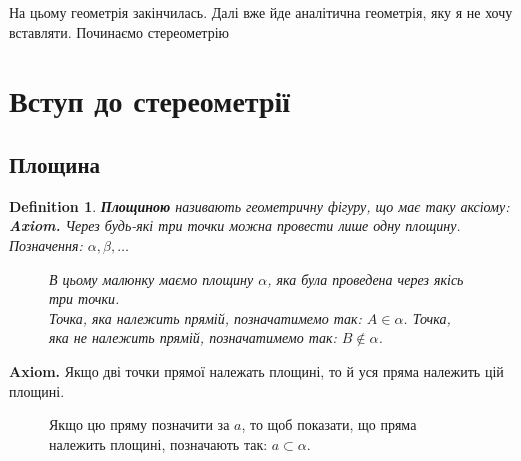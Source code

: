 \documentclass[a4paper, 10pt]{article}
\theoremstyle{theoremdd}
\theoremstyle{theoremdd}
\theoremstyle{theoremdd}
\newtheorem{definition}[theorem]{Definition}
\theoremstyle{theoremdd}
\theoremstyle{theoremdd}
\theoremstyle{theoremdd}
\theoremstyle{theoremdd}
\theoremstyle{theoremdd}
\theoremstyle{theoremdd}
\begin{document}
\newpage

\iffalse
\newpage
На цьому геометрія закінчилась. Далі вже йде аналітична геометрія, яку я не хочу вставляти. Починаємо стереометрію
\newpage

\section{Вступ до стереометрії}
\subsection{Площина}
\begin{definition}
\textbf{Площиною} називають геометричну фігуру, що має таку аксіому:\\
\textbf{Axiom.} Через будь-які три точки можна провести лише одну площину.\\
Позначення: $\alpha,\beta,\dots$
\begin{figure}[H]
\centering
{}
\caption*{В цьому малюнку маємо площину $\alpha$, яка була проведена через якісь три точки. \\
Точка, яка належить прямій, позначатимемо так: $A \in \alpha$. Точка, яка не належить прямій, позначатимемо так: $B \not\in \alpha$.}
\end{figure}
\end{definition}

\textbf{Axiom.} Якщо дві точки прямої належать площині, то й уся пряма належить цій площині.

\begin{figure}[H]
\centering
{}
\caption*{Якщо цю пряму позначити за $a$, то щоб показати, що пряма належить площині, позначають так: $a \subset \alpha$.}
\end{figure}
\end{document}
